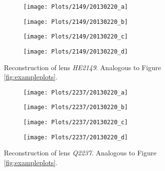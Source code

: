 \documentclass[10pt]{article}
\begin{document}
\begin{figure}[ht!]
 \centering
 \begin{subfigure}{.48\textwidth}
  \centering
  \texttt{[image: Plots/2149/20130220\_a]}
  \caption{}
 \end{subfigure}
 \begin{subfigure}{.48\textwidth}
  \centering
  \texttt{[image: Plots/2149/20130220\_b]}
  \caption{}
 \end{subfigure}
 
 \begin{subfigure}{.48\textwidth}
  \centering
  \texttt{[image: Plots/2149/20130220\_c]}
  \caption{}
 \end{subfigure}
 \begin{subfigure}{.48\textwidth}
  \centering
  \texttt{[image: Plots/2149/20130220\_d]}
  \caption{}
 \end{subfigure}
 \captionsetup{width=.93\textwidth}
 \caption{Reconstruction of lens \textit{HE2149}. Analogous to Figure \ref{fig:exampleplots}.}
 \label{fig:2149}
\end{figure}

\begin{figure}[ht!]
 \centering
 \begin{subfigure}{.48\textwidth}
  \centering
  \texttt{[image: Plots/2237/20130220\_a]}
  \caption{}
 \end{subfigure}
 \begin{subfigure}{.48\textwidth}
  \centering
  \texttt{[image: Plots/2237/20130220\_b]}
  \caption{}
 \end{subfigure}
 
 \begin{subfigure}{.48\textwidth}
  \centering
  \texttt{[image: Plots/2237/20130220\_c]}
  \caption{}
 \end{subfigure}
 \begin{subfigure}{.48\textwidth}
  \centering
  \texttt{[image: Plots/2237/20130220\_d]}
  \caption{}
 \end{subfigure}
 \captionsetup{width=.93\textwidth}
 \caption{Reconstruction of lens \textit{Q2237}. Analogous to Figure \ref{fig:exampleplots}.}
 \label{fig:2237}
\end{figure}
\end{document}
